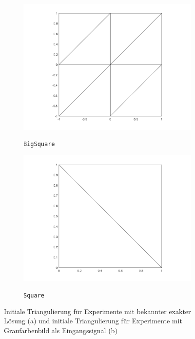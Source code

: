 \begin{figure}[p]
  \centering
  \begin{subfigure}[b]{.48\linewidth}
    \centering
    \caption{\texttt{BigSquare}}
    \includegraphics[trim = 90 30 90 20, clip, width=\linewidth]
      {pictures/chapExperiments/secGeneralInfo/bigSquareTriang.png}
    \label{fig:triangBigSquare}
  \end{subfigure}
  \quad
  \begin{subfigure}[b]{.48\linewidth}
    \centering
    \caption{\texttt{Square}}
    \includegraphics[trim = 90 30 90 20, clip, width=\linewidth]
      {pictures/chapExperiments/secGeneralInfo/squareTriang.png}
    \label{fig:triangSquare}
  \end{subfigure}
  \caption{Initiale Triangulierung für Experimente mit bekannter exakter Lösung
    (a) und initiale Triangulierung für Experimente mit Graufarbenbild als
    Eingangssignal (b)}
  \label{fig:initialTriangulations}
\end{figure}
